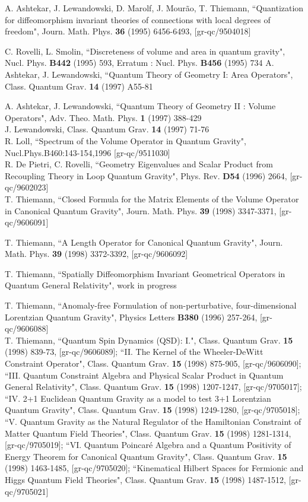 \documentclass[12pt]{report}
\begin{document}
\begin{thebibliography}{99}
 A. Ashtekar, J. Lewandowski, D. Marolf, J. Mour\~ao, T.
Thiemann, ``Quantization for diffeomorphism invariant theories
of connections with local degrees of freedom", Journ. Math. Phys.
{\bf 36} (1995) 6456-6493, [gr-qc/9504018]

 C. Rovelli, L. Smolin,
``Discreteness of volume and area in quantum gravity",
Nucl. Phys. {\bf B442} (1995) 593, Erratum : Nucl. Phys. {\bf B456}
(1995) 734
A. Ashtekar, J. Lewandowski,
``Quantum Theory of Geometry I: Area Operators",
Class. Quantum Grav. {\bf 14} (1997) A55-81


A. Ashtekar, J. Lewandowski, ``Quantum Theory of Geometry II :
Volume Operators", Adv. Theo. Math. Phys. {\bf 1} (1997) 388-429 \\
J. Lewandowski, Class. Quantum Grav. {\bf 14} (1997) 71-76\\
R. Loll, ``Spectrum of the Volume Operator in Quantum Gravity",
Nucl.Phys.B460:143-154,1996 [gr-qc/9511030]\\
R. De Pietri, C. Rovelli, ``Geometry Eigenvalues and Scalar
Product from Recoupling Theory in Loop Quantum Gravity",
Phys. Rev. {\bf D54} (1996) 2664, [gr-qc/9602023]\\
T. Thiemann,
``Closed Formula for the Matrix Elements of the Volume Operator in
Canonical Quantum Gravity", Journ. Math. Phys. {\bf 39} (1998) 3347-3371,
[gr-qc/9606091]


 T. Thiemann,
``A Length Operator for Canonical Quantum Gravity", Journ. Math. Phys.
{\bf 39} (1998) 3372-3392, [gr-qc/9606092]

 T. Thiemann, ``Spatially Diffeomorphism Invariant 
Geometrical Operators in Quantum General Relativity", work in progress

 T. Thiemann, ``Anomaly-free Formulation of non-perturbative,
four-dimensional Lorentzian Quantum Gravity", Physics Letters {\bf B380}
(1996) 257-264, [gr-qc/9606088]\\
T. Thiemann, ``Quantum Spin Dynamics (QSD): I.",
Class. Quantum Grav. {\bf 15} (1998) 839-73, [gr-qc/9606089];
``II. The Kernel of the Wheeler-DeWitt Constraint Operator",
Class. Quantum Grav. {\bf 15} (1998) 875-905, [gr-qc/9606090];
``III. Quantum Constraint Algebra and Physical Scalar Product in Quantum 
General Relativity", Class. Quantum Grav. {\bf 15} (1998) 1207-1247,
[gr-qc/9705017]; ``IV. 2+1 Euclidean Quantum Gravity as a model to test 3+1
Lorentzian Quantum Gravity", Class. Quantum Grav. {\bf 15} (1998) 1249-1280,
[gr-qc/9705018];
``V. Quantum Gravity as the Natural Regulator of the Hamiltonian Constraint
of Matter Quantum Field Theories",
Class. Quantum Grav. {\bf 15} (1998) 1281-1314, [gr-qc/9705019];
``VI. Quantum Poincar\'e Algebra and a Quantum Positivity of Energy
Theorem for Canonical Quantum Gravity",
Class. Quantum Grav. {\bf 15} (1998) 1463-1485, [gr-qc/9705020];
``Kinematical Hilbert Spaces for Fermionic and
Higgs Quantum Field Theories",
Class. Quantum Grav. {\bf 15} (1998) 1487-1512, [gr-qc/9705021]


\end{thebibliography}
\end{document}
